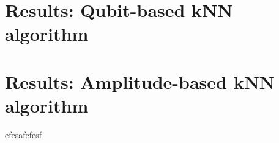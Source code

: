 \documentclass[10pt]{beamer}
\begin{document}
\section{Results: Qubit-based kNN algorithm}

{
\begin{frame}[fragile]{}




\end{frame}
}


\section{Results: Amplitude-based kNN algorithm}

{
\begin{frame}[fragile]{}
efesafefesf



\end{frame}
}
\end{document}
